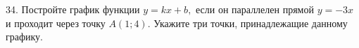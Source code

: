 34. Постройте график функции $y=kx+b,$ если он параллелен прямой $y=-3x$ и проходит через точку $A(1;4).$ Укажите три точки, принадлежащие данному графику.\\
